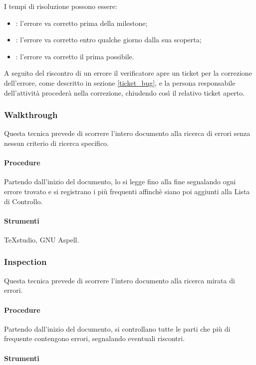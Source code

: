 I tempi di risoluzione possono essere:
\begin{itemize}
\item {}: l'errore va corretto prima della milestone;
\item {}: l'errore va corretto entro qualche giorno dalla sua scoperta;
\item {}: l'errore va corretto il prima possibile.
\end{itemize}

A seguito del riscontro di un errore il verificatore apre un ticket per la correzione dell'errore, come descritto in sezione \ref{ticket_bug}, e la persona responsabile dell'attività procederà nella correzione, chiudendo così il relativo ticket aperto.




\subsubsection{Walkthrough}
Questa tecnica prevede di scorrere l'intero documento alla ricerca di errori senza nessun criterio di ricerca specifico.
\paragraph{Procedure}

Partendo dall'inizio del documento, lo si legge fino alla fine segnalando ogni errore trovato e si registrano i più frequenti affinchè siano poi aggiunti alla Lista di Controllo.
\paragraph{Strumenti}

TeXstudio, GNU Aspell.

\subsubsection{Inspection}
Questa tecnica prevede di scorrere l'intero documento alla ricerca mirata di errori.
\paragraph{Procedure}

Partendo dall'inizio del documento, si controllano tutte le parti che più di frequente contengono errori, segnalando eventuali riscontri.
\paragraph{Strumenti}

